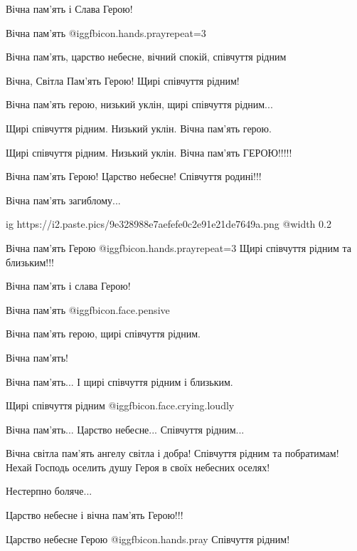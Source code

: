 \begin{itemize}
Вічна пам'ять і Слава Герою!

Вічна пам'ять @igg{fbicon.hands.pray}{repeat=3} 

Вічна пам'ять, царство небесне, вічний спокій, співчуття рідним

Вічна, Світла Пам'ять Герою! Щирі співчуття рідним!

Вічна пам'ять герою, низький уклін, щирі співчуття рідним...

Щирі співчуття рідним. Низький уклін. Вічна пам'ять герою.

Щирі співчуття рідним. Низький уклін. Вічна пам'ять ГЕРОЮ!!!!!

Вічна пам'ять Герою! Царство небесне! Співчуття родині!!!

Вічна пам'ять загиблому...

\ifcmt
  ig https://i2.paste.pics/9e328988e7aefefe0c2e91e21de7649a.png
  @width 0.2
\fi

Вічна пам'ять Герою @igg{fbicon.hands.pray}{repeat=3}  Щирі співчуття рідним та близьким!!!

Вічна пам'ять і слава Герою!

Вічна пам’ять  @igg{fbicon.face.pensive} 

Вічна пам'ять герою, щирі співчуття рідним.

Вічна пам'ять!

Вічна пам'ять... І щирі співчуття рідним і близьким.

Щирі співчуття рідним  @igg{fbicon.face.crying.loudly} 

Вічна пам'ять... Царство небесне... Співчуття рідним...


Вічна світла пам'ять ангелу світла і добра! Співчуття рідним та побратимам!
Нехай Господь оселить душу Героя в своїх небесних оселях!

Нестерпно боляче...

Царство небесне і вічна пам'ять Герою!!!

Царство небесне Герою @igg{fbicon.hands.pray} 
Співчуття рідним!


\end{itemize}
